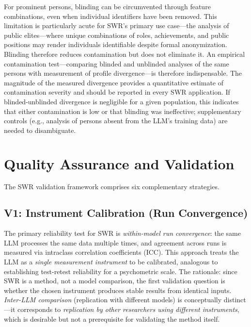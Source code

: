 \documentclass[11pt,a4paper]{article}
\theoremstyle{definition}
\theoremstyle{plain}
\theoremstyle{remark}
\begin{document}
For prominent persons, blinding can be circumvented through feature combinations, even when individual identifiers have been removed. This limitation is particularly acute for SWR's primary use case---the analysis of public elites---where unique combinations of roles, achievements, and public positions may render individuals identifiable despite formal anonymization. Blinding therefore reduces contamination but does not eliminate it. An empirical contamination test---comparing blinded and unblinded analyses of the same persons with measurement of profile divergence---is therefore indispensable. The magnitude of the measured divergence provides a quantitative estimate of contamination severity and should be reported in every SWR application. If blinded-unblinded divergence is negligible for a given population, this indicates that either contamination is low or that blinding was ineffective; supplementary controls (e.g., analysis of persons absent from the LLM's training data) are needed to disambiguate.



\section{Quality Assurance and Validation}
\label{sec:quality}

The SWR validation framework comprises six complementary strategies.

\subsection{V1: Instrument Calibration (Run Convergence)}

The primary reliability test for SWR is \emph{within-model run convergence}: the same LLM processes the same data multiple times, and agreement across runs is measured via intraclass correlation coefficients (ICC). This approach treats the LLM as a \emph{single measurement instrument} to be calibrated, analogous to establishing test-retest reliability for a psychometric scale. The rationale: since SWR is a method, not a model comparison, the first validation question is whether the chosen instrument produces stable results from identical inputs. \emph{Inter-LLM comparison} (replication with different models) is conceptually distinct---it corresponds to \emph{replication by other researchers using different instruments}, which is desirable but not a prerequisite for validating the method itself.
\end{document}
